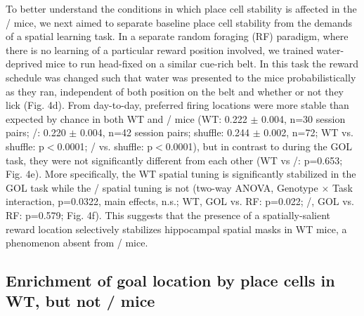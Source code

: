 To better understand the conditions in which place cell stability is affected in the \df/ mice, we next aimed to separate baseline place cell stability from the demands of a spatial learning task.  In a separate random foraging (RF) paradigm, where there is no learning of a particular reward position involved, we trained water-deprived mice to run head-fixed on a similar cue-rich belt. In this task the reward schedule was changed such that water was presented to the mice probabilistically as they ran, independent of both position on the belt and whether or not they lick (Fig. 4d). From day-to-day, preferred firing locations were more stable than expected by chance in both WT and \df/ mice (WT: 0.222 $\pm$ 0.004, n=30 session pairs; \df/: 0.220 $\pm$ 0.004, n=42 session pairs; shuffle: 0.244 $\pm$ 0.002, n=72; WT vs. shuffle: p$<$0.0001; \df/ vs. shuffle: p$<$0.0001), but in contrast to during the GOL task, they were not significantly different from each other (WT vs \df/: p=0.653; Fig. 4e). More specifically, the WT spatial tuning is significantly stabilized in the GOL task while the \df/ spatial tuning is not (two-way ANOVA, Genotype $\times$ Task interaction, p=0.0322, main effects, n.s.; WT, GOL vs. RF: p=0.022; \df/, GOL vs. RF: p=0.579; Fig. 4f). This suggests that the presence of a spatially-salient reward location selectively stabilizes hippocampal spatial masks in WT mice, a phenomenon absent from \df/ mice.

\subsection{Enrichment of goal location by place cells in WT, but not \df/ mice}
\label{sec:df:results:enrichment}

